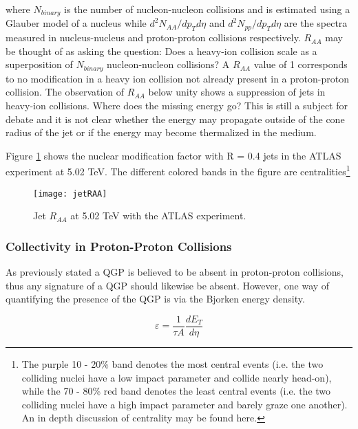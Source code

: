 \noindent
where $N_{binary}$ is the number of nucleon-nucleon collisions and is estimated using a Glauber model\cite{Miller:2007ri} of a nucleus while $d^{2}N_{AA}/dp_{T}d\eta$ and $d^{2}N_{pp}/dp_{T}d\eta$ are the spectra measured in nucleus-nucleus and proton-proton collisions respectively.  $R_{AA}$ may be thought of as asking the question: Does a heavy-ion collision scale as a superposition of $N_{binary}$ nucleon-nucleon collisions?  A $R_{AA}$ value of 1 corresponds to no modification in a heavy ion collision not already present in a proton-proton collision.  The observation of $R_{AA}$ below unity shows a suppression of jets in heavy-ion collisions.  Where does the missing energy go?  This is still a subject for debate and it is not clear whether the energy may propagate outside of the cone radius of the jet or if the energy may become thermalized in the medium.


Figure \ref{fig:JetRAA} shows the nuclear modification factor with R = 0.4 jets in the ATLAS experiment at 5.02 TeV\cite{Aaboud:2018twu}.  The different colored bands in the figure are centralities\footnote{The purple 10 - 20\% band denotes the most central events (i.e. the two colliding nuclei have a low impact parameter and collide nearly head-on), while the 70 - 80\% red band denotes the least central events (i.e. the two colliding nuclei have a high impact parameter and barely graze one another).  An in depth discussion of centrality may be found here\cite{Klochkov_2017}.}

\begin{figure}[h]
\texttt{[image: jetRAA]}
\centering
\caption{Jet $R_{AA}$ at 5.02 TeV with the ATLAS experiment\cite{Aaboud:2018twu}.}
\label{fig:JetRAA}
\end{figure}



\subsubsection{Collectivity in Proton-Proton Collisions}
As previously stated a QGP is believed to be absent in proton-proton collisions, thus any signature of a QGP should likewise be absent.  However, one way of quantifying the presence of the QGP is via the Bjorken energy density.  

\begin{equation}
\varepsilon = \frac{1}{\tau A} \frac{dE_{T}}{d \eta}
\label{eq:bjorkenEt}
\end{equation}

